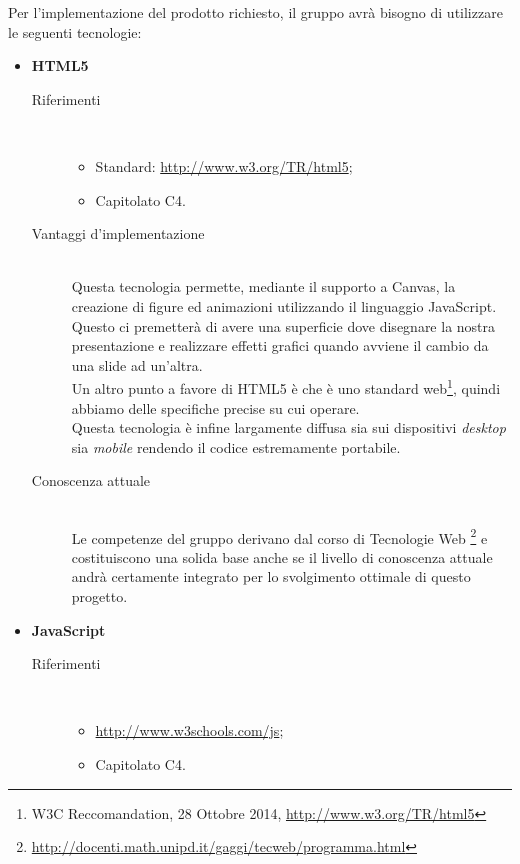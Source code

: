 Per l'implementazione del prodotto richiesto, il gruppo avrà bisogno di utilizzare le seguenti tecnologie:
\begin{itemize}
	\item \textbf{\gls{HTML5}}
	\begin{description}
		\item[Riferimenti]\ 
		\noindent\begin{itemize}
			\item Standard: \url{http://www.w3.org/TR/html5};
			\item Capitolato C4.
		\end{itemize}
		
		\item[Vantaggi d'implementazione]\ \\
		\noindent Questa tecnologia permette, mediante il supporto a Canvas, la creazione di figure ed animazioni  utilizzando il linguaggio \gls{JavaScript}. Questo ci premetterà di avere una superficie dove disegnare la nostra presentazione e realizzare effetti grafici quando avviene il cambio da una \gls{slide} ad un'altra. \\ Un altro punto a favore di \gls{HTML5} è che è uno standard web\footnote{W3C Reccomandation, 28 Ottobre 2014, \url{http://www.w3.org/TR/html5}}, quindi abbiamo delle specifiche precise su cui operare. \\ Questa tecnologia è infine largamente diffusa sia sui dispositivi \textit{desktop} sia \textit{mobile} rendendo il codice estremamente portabile.

		\item[Conoscenza attuale]\ \\
		\noindent Le competenze del gruppo \GRUPPO{}  derivano dal corso di Tecnologie Web \footnote{\url{http://docenti.math.unipd.it/gaggi/tecweb/programma.html}} e costituiscono una solida base anche se il livello di conoscenza attuale andrà certamente integrato per lo svolgimento ottimale di questo progetto.
	\end{description}

	\item \textbf{\gls{JavaScript}}
	\begin{description}
		\item[Riferimenti]\ 
		\noindent\begin{itemize}
			\item \url{http://www.w3schools.com/js};
			\item Capitolato C4.
		\end{itemize}
		

\end{description}
\end{itemize}
